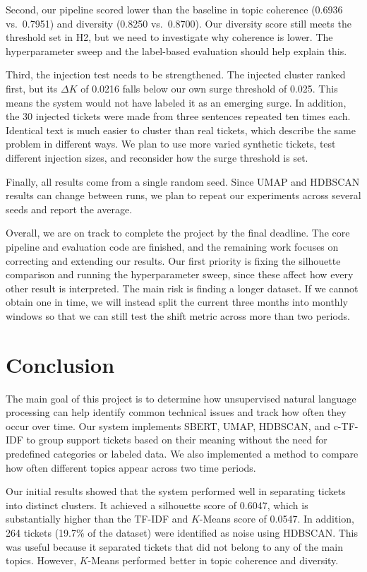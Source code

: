 \documentclass[sigconf,nonacm]{acmart}
\begin{document}
Second, our pipeline scored lower than the baseline in topic coherence (0.6936 vs.\ 0.7951) and diversity (0.8250 vs.\ 0.8700). Our diversity score still meets the threshold set in H2, but we need to investigate why coherence is lower. The hyperparameter sweep and the label-based evaluation should help explain this.

Third, the injection test needs to be strengthened. The injected cluster ranked first, but its $\Delta K$ of 0.0216 falls below our own surge threshold of 0.025. This means the system would not have labeled it as an emerging surge. In addition, the 30 injected tickets were made from three sentences repeated ten times each. Identical text is much easier to cluster than real tickets, which describe the same problem in different ways. We plan to use more varied synthetic tickets, test different injection sizes, and reconsider how the surge threshold is set.

Finally, all results come from a single random seed. Since UMAP and HDBSCAN results can change between runs, we plan to repeat our experiments across several seeds and report the average.

Overall, we are on track to complete the project by the final deadline. The core pipeline and evaluation code are finished, and the remaining work focuses on correcting and extending our results. Our first priority is fixing the silhouette comparison and running the hyperparameter sweep, since these affect how every other result is interpreted. The main risk is finding a longer dataset. If we cannot obtain one in time, we will instead split the current three months into monthly windows so that we can still test the shift metric across more than two periods.

\section{Conclusion}
The main goal of this project is to determine how unsupervised natural language processing can help identify common technical issues and track how often they occur over time. Our system implements SBERT, UMAP, HDBSCAN, and c-TF-IDF to group support tickets based on their meaning without the need for predefined categories or labeled data. We also implemented a method to compare how often different topics appear across two time periods.

Our initial results showed that the system performed well in separating tickets into distinct clusters. It achieved a silhouette score of 0.6047, which is substantially higher than the TF-IDF and $K$-Means score of 0.0547. In addition, 264 tickets (19.7\% of the dataset) were identified as noise using HDBSCAN. This was useful because it separated tickets that did not belong to any of the main topics. However, $K$-Means performed better in topic coherence and diversity.
\end{document}
